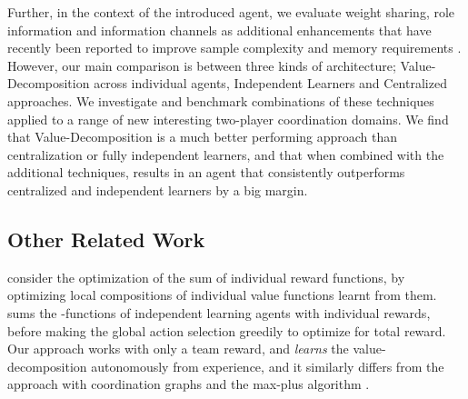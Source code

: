 \documentclass{article}
\begin{document}
Further, in the context of the introduced agent, we evaluate weight sharing, role information and information channels as additional enhancements that have recently been reported to improve sample complexity and memory requirements \citep{HausknechtThesis,FoersterCommunicate, SF16}. However, our main comparison is between three kinds of architecture; Value-Decomposition across individual agents, Independent Learners and Centralized approaches. We investigate and benchmark combinations of these techniques applied to a range of new interesting two-player coordination domains. We find that Value-Decomposition is a much better performing approach than centralization or fully independent learners, and that when combined with the additional techniques, results in an agent that consistently outperforms centralized and independent learners by a big margin.





\iffalse
These architectures bring us to a further point about homogeneous approaches.
Besides the obvious homogeneous approach of identical fully individual agents, we see that there is a larger class of options satisfying an agent-invariance property that we introduce here. These can be seen as less naive and more sparsely connected centralized architectures. Though these are able to succeed where the more naively centralized agents fail, it is an important point that our value-decomposition method can train successfully coordinated individual agents.
\fi





\subsection{Other Related Work}

\citet{SchneiderDistributed} consider the optimization of the sum of individual reward functions, by optimizing local compositions of individual value functions learnt from them. \citet{RussellZimdarsQDecomposition} sums the -functions of independent learning agents with individual rewards, before making the global action selection greedily to optimize for total reward. Our approach works with only a team reward, and \emph{learns} the value-decomposition autonomously from experience, and it similarly differs from the approach with coordination graphs \citep{Guestrin2002} and the max-plus algorithm \citep{KuyerWBV08,Pol16}.
\end{document}
